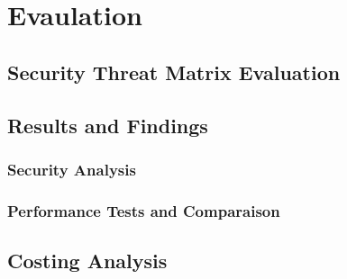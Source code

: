 \chapter{Evaulation}\label{C:evaulation}

\section{Security Threat Matrix Evaluation}

\section{Results and Findings}
	\subsection{Security Analysis}

	\subsection{Performance Tests and Comparaison}

\section{Costing Analysis}